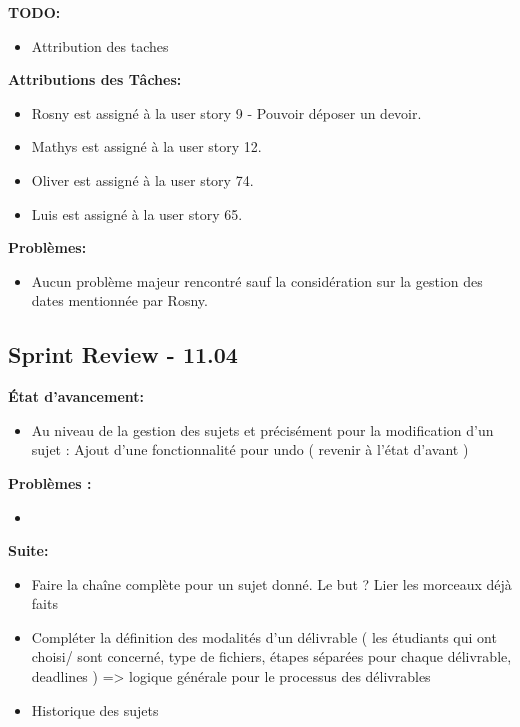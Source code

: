 \documentclass[11pt]{article}
\begin{document}
\textbf{TODO:}
\begin{itemize}
  \item Attribution des taches 
\end{itemize}

\textbf{Attributions des Tâches:}
\begin{itemize}
  \item Rosny est assigné à la user story 9 - Pouvoir déposer un devoir.
  \item Mathys est assigné à la user story 12.
  \item Oliver est assigné à la user story 74.
  \item Luis est assigné à la user story 65.
\end{itemize}

\textbf{Problèmes:}
\begin{itemize}
  \item Aucun problème majeur rencontré sauf la considération sur la gestion des dates mentionnée par Rosny.
\end{itemize}

\subsection*{{\color{navy}Sprint Review - 11.04}}
\textbf{État d'avancement:}
\begin{itemize}
  \item Au niveau de la gestion des sujets et précisément pour la modification d’un sujet : Ajout d’une fonctionnalité pour undo ( revenir à l’état d’avant )
\end{itemize}
\textbf{Problèmes :}
\begin{itemize}
  \item 
\end{itemize}
\textbf{Suite:}
\begin{itemize}
 \item Faire la chaîne complète pour un sujet donné. Le but ? Lier les morceaux déjà faits
 \item Compléter la définition des modalités d’un délivrable  ( les étudiants qui ont choisi/ sont concerné, type de fichiers, étapes séparées pour chaque délivrable, deadlines ) => logique générale pour le processus des délivrables 
 \item Historique des sujets

\end{itemize}
\end{document}
